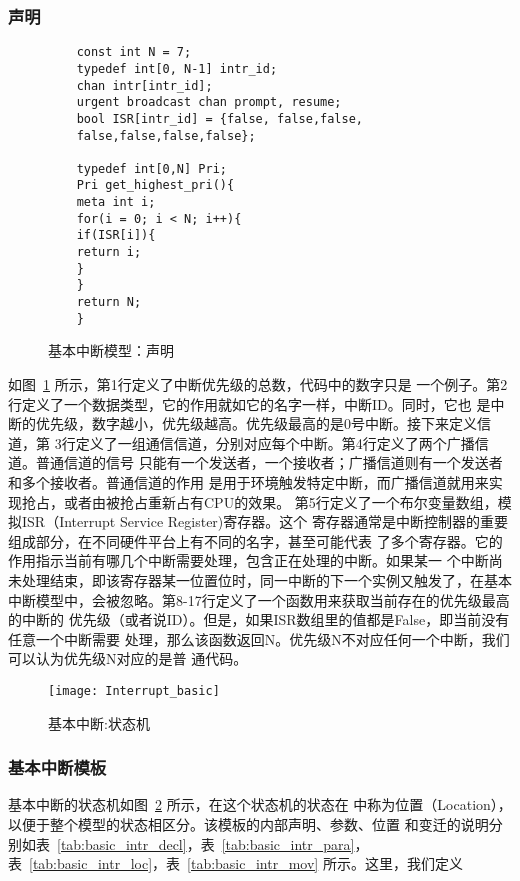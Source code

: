 \subsubsection{声明}
\label{subsubsec:basic_decl}

\begin{figure}[H]
	\centering
	\begin{lstlisting}
	const int N = 7;
	typedef int[0, N-1] intr_id; 
	chan intr[intr_id];
	urgent broadcast chan prompt, resume;
	bool ISR[intr_id] = {false, false,false,
	false,false,false,false};
	
	typedef int[0,N] Pri;
	Pri get_highest_pri(){
	meta int i;
	for(i = 0; i < N; i++){
	if(ISR[i]){
	return i;
	} 
	}
	return N;
	}
	\end{lstlisting}
	\caption{基本中断模型：声明}
	\label{fig:basic_decl}
\end{figure}

如图~\ref{fig:basic_decl} 所示，第1行定义了中断优先级的总数，代码中的数字只是
一个例子。第2行定义了一个数据类型，它的作用就如它的名字一样，中断ID。同时，它也
是中断的优先级，数字越小，优先级越高。优先级最高的是0号中断。接下来定义信道，第
3行定义了一组通信信道，分别对应每个中断。第4行定义了两个广播信道。普通信道的信号
只能有一个发送者，一个接收者；广播信道则有一个发送者和多个接收者。普通信道的作用
是用于环境触发特定中断，而广播信道就用来实现抢占，或者由被抢占重新占有CPU的效果。
第5行定义了一个布尔变量数组，模拟ISR（Interrupt Service Register)寄存器。这个
寄存器通常是中断控制器的重要组成部分，在不同硬件平台上有不同的名字，甚至可能代表
了多个寄存器。它的作用指示当前有哪几个中断需要处理，包含正在处理的中断。如果某一
个中断尚未处理结束，即该寄存器某一位置位时，同一中断的下一个实例又触发了，在基本
中断模型中，会被忽略。第8-17行定义了一个函数用来获取当前存在的优先级最高的中断的
优先级（或者说ID）。但是，如果ISR数组里的值都是False，即当前没有任意一个中断需要
处理，那么该函数返回N。优先级N不对应任何一个中断，我们可以认为优先级N对应的是普
通代码。

\begin{figure}[H]
	\centering
	\texttt{[image: Interrupt\_basic]}
	\caption{基本中断:状态机}
	\label{fig:interrupt_basic}
\end{figure}

\subsubsection{基本中断模板}
\label{subsubsec:basic_intr}

基本中断的状态机如图~\ref{fig:interrupt_basic} 所示，在这个状态机的状态在\uppaal 
中称为位置（Location），以便于整个模型的状态相区分。该模板的内部声明、参数、位置
和变迁的说明分别如表~\ref{tab:basic_intr_decl}，表~\ref{tab:basic_intr_para}，
表~\ref{tab:basic_intr_loc}，表~\ref{tab:basic_intr_mov} 所示。这里，我们定义

